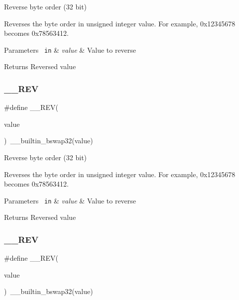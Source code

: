 Reverse byte order (32 bit) 

Reverses the byte order in unsigned integer value. For example, 0x12345678 becomes 0x78563412. 
\begin{DoxyParams}[1]{Parameters}
\mbox{\texttt{ in}}  & {\em value} & Value to reverse \\
\hline
\end{DoxyParams}
\begin{DoxyReturn}{Returns}
Reversed value 
\end{DoxyReturn}
\mbox{\label{group___c_m_s_i_s___core___instruction_interface_gaca25a02e09983da5558f5242f2f635bc}} 
\subsubsection{\texorpdfstring{\_\_REV}{\_\_REV}\hspace{0.1cm}{\footnotesize\ttfamily [2/3]}}
{\footnotesize\ttfamily \#define \+\_\+\+\_\+\+R\+EV(\begin{DoxyParamCaption}\item[{}]{value }\end{DoxyParamCaption})~\+\_\+\+\_\+builtin\+\_\+bswap32(value)}



Reverse byte order (32 bit) 

Reverses the byte order in unsigned integer value. For example, 0x12345678 becomes 0x78563412. 
\begin{DoxyParams}[1]{Parameters}
\mbox{\texttt{ in}}  & {\em value} & Value to reverse \\
\hline
\end{DoxyParams}
\begin{DoxyReturn}{Returns}
Reversed value 
\end{DoxyReturn}
\mbox{\label{group___c_m_s_i_s___core___instruction_interface_gaca25a02e09983da5558f5242f2f635bc}} 
\subsubsection{\texorpdfstring{\_\_REV}{\_\_REV}\hspace{0.1cm}{\footnotesize\ttfamily [3/3]}}
{\footnotesize\ttfamily \#define \+\_\+\+\_\+\+R\+EV(\begin{DoxyParamCaption}\item[{}]{value }\end{DoxyParamCaption})~\+\_\+\+\_\+builtin\+\_\+bswap32(value)}



